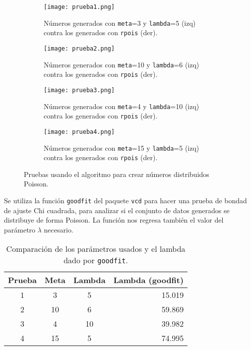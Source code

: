 \documentclass[12pt,letterpaper]{article}
\begin{document}
\begin{figure}
 	\centering 
 	\begin{subfigure}[b]{0.45\linewidth}
 		\texttt{[image: prueba1.png]} 		
 		\caption{Números generados con \texttt{meta}=3 y \texttt{lambda}=5 (izq) contra los generados con \texttt{rpois} (der).}
 		 		\label{pr1}
 	\end{subfigure}
 	\hfill
 	\begin{subfigure}[b]{0.45\linewidth}
 		\texttt{[image: prueba2.png]} 		
 		\caption{Números generados con \texttt{meta}=10 y \texttt{lambda}=6 (izq) contra los generados con \texttt{rpois} (der).}
 		\label{pr2}
 	\end{subfigure}
 	 	\begin{subfigure}[b]{0.45\linewidth}
 		\texttt{[image: prueba3.png]} 		
 		\caption{Números generados con \texttt{meta}=4 y \texttt{lambda}=10 (izq) contra los generados con \texttt{rpois} (der).}
 		\label{pr3}
 	\end{subfigure}
 	 	\hfill
 	 	\begin{subfigure}[b]{0.45\linewidth}
 		\texttt{[image: prueba4.png]} 		
 		\caption{Números generados con \texttt{meta}=15 y \texttt{lambda}=5 (izq) contra los generados con \texttt{rpois} (der).}
 		\label{pr4}
 	\end{subfigure}

 	 	\caption{Pruebas usando el algoritmo para crear números distribuidos Poisson.} 
 	 		\label{prs}
\end{figure}
Se utiliza la función \texttt{goodfit} del paquete \texttt{vcd} para hacer una prueba de bondad de ajuste Chi cuadrada, para analizar si el conjunto de datos generados se distribuye de forma Poisson. La función nos regresa también el valor del parámetro $\lambda$ necesario. 


\begin{table}
\centering
\caption{Comparación de los parámetros usados y el lambda dado por \texttt{goodfit}.}
\begin{tabular}{cccr}
\hline 
Prueba & Meta & Lambda & Lambda (goodfit) \\ 
\hline 
1 & 3 & 5 & 15.019 \\ 
2 & 10 & 6 & 59.869 \\ 
3 & 4 & 10 & 39.982 \\ 
4 & 15 & 5 & 74.995 \\ 
\hline 
\end{tabular} 
\label{datos}
\end{table}
\end{document}
